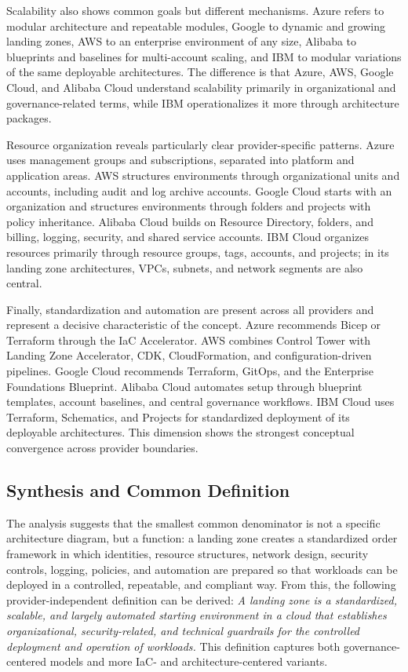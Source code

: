 Scalability also shows common goals but different mechanisms. Azure refers to modular architecture and repeatable modules, Google to dynamic and growing landing zones, AWS to an enterprise environment of any size, Alibaba to blueprints and baselines for multi-account scaling, and IBM to modular variations of the same deployable architectures. The difference is that Azure, AWS, Google Cloud, and Alibaba Cloud understand scalability primarily in organizational and governance-related terms, while IBM operationalizes it more through architecture packages.

Resource organization reveals particularly clear provider-specific patterns. Azure uses management groups and subscriptions, separated into platform and application areas. AWS structures environments through organizational units and accounts, including audit and log archive accounts. Google Cloud starts with an organization and structures environments through folders and projects with policy inheritance. Alibaba Cloud builds on Resource Directory, folders, and billing, logging, security, and shared service accounts. IBM Cloud organizes resources primarily through resource groups, tags, accounts, and projects; in its landing zone architectures, VPCs, subnets, and network segments are also central.

Finally, standardization and automation are present across all providers and represent a decisive characteristic of the concept. Azure recommends Bicep or Terraform through the IaC Accelerator. AWS combines Control Tower with Landing Zone Accelerator, CDK, CloudFormation, and configuration-driven pipelines. Google Cloud recommends Terraform, GitOps, and the Enterprise Foundations Blueprint. Alibaba Cloud automates setup through blueprint templates, account baselines, and central governance workflows. IBM Cloud uses Terraform, Schematics, and Projects for standardized deployment of its deployable architectures. This dimension shows the strongest conceptual convergence across provider boundaries.

\subsection{Synthesis and Common Definition}

The analysis suggests that the smallest common denominator is not a specific architecture diagram, but a function: a landing zone creates a standardized order framework in which identities, resource structures, network design, security controls, logging, policies, and automation are prepared so that workloads can be deployed in a controlled, repeatable, and compliant way. From this, the following provider-independent definition can be derived: \emph{A landing zone is a standardized, scalable, and largely automated starting environment in a cloud that establishes organizational, security-related, and technical guardrails for the controlled deployment and operation of workloads.} This definition captures both governance-centered models and more IaC- and architecture-centered variants.